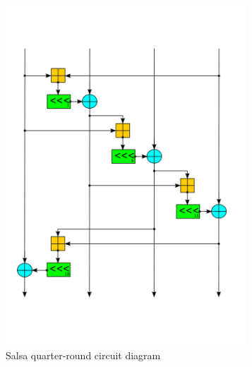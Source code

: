 \begin{figure}
\centering
\begin{subfigure}[t]{0.47\textwidth}
  \centering
  \includegraphics[width=0.99\textwidth]{figures/wiki-qr-circuit/salsa-wiki-qr-circuit.png}
  \caption{Salsa quarter-round circuit diagram}
  \label{fig:wiki.qr.circuit.salsa}
\end{subfigure}%
\begin{subfigure}[t]{0.47\textwidth}
  \centering

\end{subfigure}
\end{figure}
